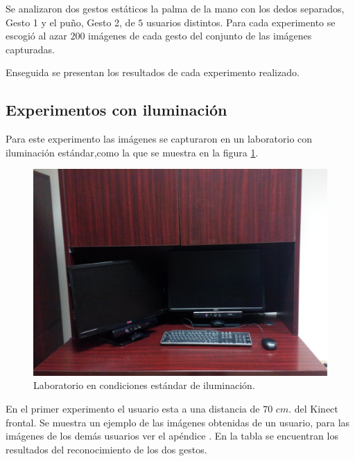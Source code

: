 Se analizaron dos gestos estáticos la palma de la mano con los dedos separados, Gesto 1 y el puño, Gesto 2, de $5$ usuarios distintos. Para cada experimento se escogió al azar $200$ imágenes de cada gesto del conjunto de las imágenes capturadas. 

Enseguida se presentan los resultados de cada experimento realizado.

\subsection{Experimentos con iluminación} 
Para este experimento las imágenes se capturaron en un laboratorio con iluminación estándar,como la que se muestra en la figura \ref{fig:LabIluminado}.

\begin{figure}[h!]
\begin{center} 
\includegraphics[scale=0.09]{./Figures/iluminacion.jpg}
\end{center}
\caption{Laboratorio en condiciones estándar de iluminación.}
\label{fig:LabIluminado}
\end{figure} 

En el primer experimento el usuario esta a una distancia de $70$ $cm.$ del Kinect frontal. Se muestra un ejemplo de las imágenes obtenidas de un usuario, para las imágenes de los demás usuarios ver el apéndice . En la tabla se encuentran los resultados del reconocimiento de los dos gestos.  


